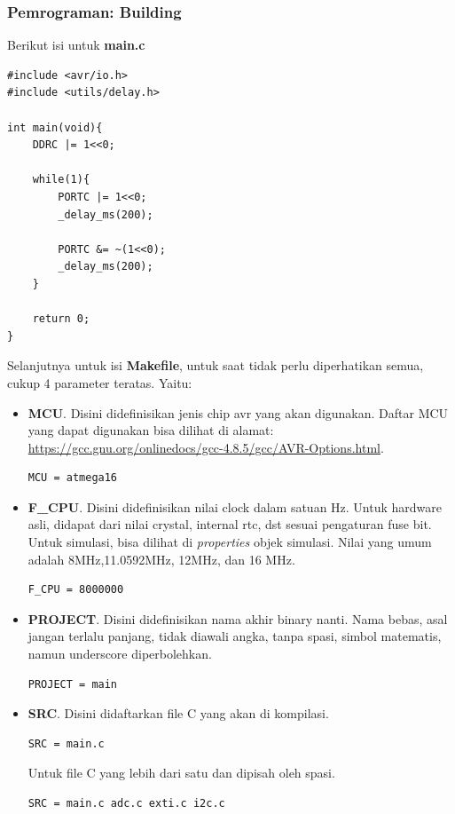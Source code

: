 \documentclass[12pt,]{article}
\begin{document}
	\newpage
	\subsubsection{Pemrograman: Building}

	Berikut isi untuk \textbf{main.c}
	\begin{verbatim}
#include <avr/io.h>
#include <utils/delay.h>

int main(void){
	DDRC |= 1<<0;

	while(1){
		PORTC |= 1<<0;
		_delay_ms(200);

		PORTC &= ~(1<<0);
		_delay_ms(200);
	}

	return 0;
}
	\end{verbatim}

	Selanjutnya untuk isi \textbf{Makefile}, untuk saat tidak perlu diperhatikan semua, cukup 4 parameter teratas.
	Yaitu:
	\begin{itemize}
		\item \textbf{MCU}. Disini didefinisikan jenis chip avr yang akan digunakan.
		Daftar MCU yang dapat digunakan bisa dilihat di alamat:\\
		\url{https://gcc.gnu.org/onlinedocs/gcc-4.8.5/gcc/AVR-Options.html}.

		\begin{verbatim}
MCU = atmega16
		\end{verbatim}

		\item \textbf{F\_CPU}. Disini didefinisikan nilai clock dalam satuan Hz.
		Untuk hardware asli, didapat dari nilai crystal, internal rtc, dst sesuai pengaturan fuse bit.
		Untuk simulasi, bisa dilihat di \textit{properties} objek simulasi.
		Nilai yang umum adalah 8MHz,11.0592MHz, 12MHz, dan 16 MHz.
		\begin{verbatim}
F_CPU = 8000000
		\end{verbatim}

		\item \textbf{PROJECT}. Disini didefinisikan nama akhir binary nanti.
		Nama bebas, asal jangan terlalu panjang, tidak diawali angka, tanpa spasi, simbol matematis, namun underscore diperbolehkan.
		\begin{verbatim}
PROJECT = main
		\end{verbatim}

		\item \textbf{SRC}. Disini didaftarkan file C yang akan di kompilasi.

		\begin{verbatim}
SRC = main.c
		\end{verbatim}

		Untuk file C yang lebih dari satu dan dipisah oleh spasi.

		\begin{verbatim}
SRC = main.c adc.c exti.c i2c.c
		\end{verbatim}
	\end{itemize}
\end{document}
